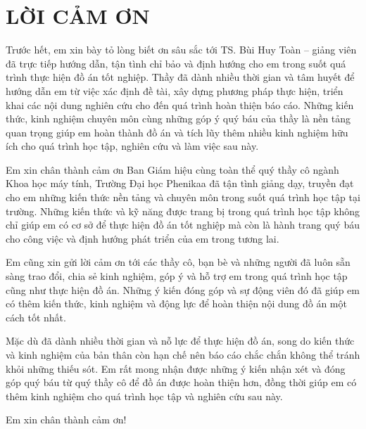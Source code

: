 \section*{LỜI CẢM ƠN}
Trước hết, em xin bày tỏ lòng biết ơn sâu sắc tới TS. Bùi Huy Toàn – giảng viên đã trực tiếp hướng dẫn, tận tình chỉ bảo và định hướng cho em trong suốt quá trình thực hiện đồ án tốt nghiệp. Thầy đã dành nhiều thời gian và tâm huyết để hướng dẫn em từ việc xác định đề tài, xây dựng phương pháp thực hiện, triển khai các nội dung nghiên cứu cho đến quá trình hoàn thiện báo cáo. Những kiến thức, kinh nghiệm chuyên môn cùng những góp ý quý báu của thầy là nền tảng quan trọng giúp em hoàn thành đồ án và tích lũy thêm nhiều kinh nghiệm hữu ích cho quá trình học tập, nghiên cứu và làm việc sau này.

Em xin chân thành cảm ơn Ban Giám hiệu cùng toàn thể quý thầy cô ngành Khoa học máy tính, Trường Đại học Phenikaa đã tận tình giảng dạy, truyền đạt cho em những kiến thức nền tảng và chuyên môn trong suốt quá trình học tập tại trường. Những kiến thức và kỹ năng được trang bị trong quá trình học tập không chỉ giúp em có cơ sở để thực hiện đồ án tốt nghiệp mà còn là hành trang quý báu cho công việc và định hướng phát triển của em trong tương lai.

Em cũng xin gửi lời cảm ơn tới các thầy cô, bạn bè và những người đã luôn sẵn sàng trao đổi, chia sẻ kinh nghiệm, góp ý và hỗ trợ em trong quá trình học tập cũng như thực hiện đồ án. Những ý kiến đóng góp và sự động viên đó đã giúp em có thêm kiến thức, kinh nghiệm và động lực để hoàn thiện nội dung đồ án một cách tốt nhất.

Mặc dù đã dành nhiều thời gian và nỗ lực để thực hiện đồ án, song do kiến thức và kinh nghiệm của bản thân còn hạn chế nên báo cáo chắc chắn không thể tránh khỏi những thiếu sót. Em rất mong nhận được những ý kiến nhận xét và đóng góp quý báu từ quý thầy cô để đồ án được hoàn thiện hơn, đồng thời giúp em có thêm kinh nghiệm cho quá trình học tập và nghiên cứu sau này.

Em xin chân thành cảm ơn!

\clearpage
